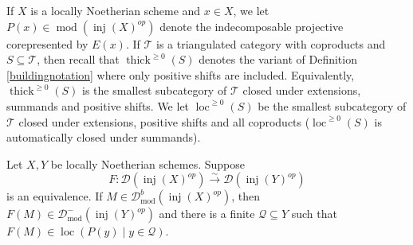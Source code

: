 \documentclass[12pt,oneside]{amsart}
\DeclareMathOperator{\loc}{loc}
\DeclareMathOperator{\thick}{thick}
\DeclareMathOperator{\fdmod}{mod}
\DeclareMathOperator{\inj}{inj}
\begin{document}
\begin{notation} If $X$ is a locally Noetherian scheme and $x \in X$, we let $P(x) \in \fdmod(\inj(X)^{op})$ denote the indecomposable projective corepresented by $E(x)$. If $\mathcal{T}$ is a triangulated category with coproducts and $S \subseteq \mathcal{T}$, then recall that $\thick^{\geq 0}(S)$ denotes the variant of Definition \ref{buildingnotation} where only positive shifts are included. Equivalently, $\thick^{\geq 0}(S)$ is the smallest subcategory of $\mathcal{T}$ closed under extensions, summands and positive shifts. We let $\loc^{\geq 0}(S)$ be the smallest subcategory of $\mathcal{T}$ closed under extensions, positive shifts and all coproducts ($\loc^{\geq 0}(S)$ is automatically closed under summands). 

\end{notation}
\begin{lemma} \label{lemma1equiv}
Let $X,Y$ be locally Noetherian schemes. Suppose 
\[
F: \mathcal{D}(\inj(X)^{op}) \xrightarrow{\sim} \mathcal{D}(\inj(Y)^{op})
\]
is an equivalence. If $M \in \mathcal{D}^b_{\fdmod}(\inj(X)^{op})$, then $F(M) \in \mathcal{D}^-_{\fdmod}(\inj(Y)^{op})$ and there is a finite $\mathcal{Q} \subseteq Y$ such that $F(M) \in \loc(P(y) \mid y \in \mathcal{Q})$.
\end{lemma}
\end{document}

